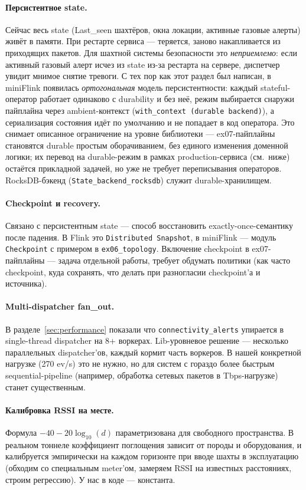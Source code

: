 \paragraph{Персистентное state.} Сейчас весь state (Last\_seen
шахтёров, окна локации, активные газовые алерты) живёт в памяти. При
рестарте сервиса --- теряется, заново накапливается из приходящих
пакетов. Для шахтной системы безопасности это \emph{неприемлемо}:
если активный газовый алерт исчез из state из-за рестарта на
сервере, диспетчер увидит мнимое снятие тревоги.
С тех пор как этот раздел был написан, в miniFlink появилась
\emph{ортогональная} модель персистентности: каждый stateful-оператор
работает одинаково с durability и без неё, режим выбирается снаружи
пайплайна через ambient-контекст (\texttt{with\_context (durable
backend)}), а сериализация состояния идёт по умолчанию и не попадает в
код оператора. Это снимает описанное ограничение на уровне
библиотеки --- ex07-пайплайны становятся durable простым оборачиванием,
без единого изменения доменной логики; их перевод на durable-режим в
рамках production-сервиса (см.\ ниже) остаётся прикладной задачей, но
уже не требует переписывания операторов. RocksDB-бэкенд
(\texttt{State\_backend\_rocksdb}) служит durable-хранилищем.

\paragraph{Checkpoint и recovery.} Связано с персистентным state ---
способ восстановить exactly-once-семантику после падения. В Flink
это \texttt{Distributed Snapshot}, в miniFlink --- модуль
\texttt{Checkpoint} с примером в \texttt{ex06\_topology}. Включение
checkpoint в ex07-пайплайны --- задача отдельной работы, требует
обдумать политики (как часто checkpoint, куда сохранять, что делать
при разногласии checkpoint'а и источника).

\paragraph{Multi-dispatcher fan\_out.} В разделе~\ref{sec:performance}
показали что \texttt{connectivity\_alerts} упирается в single-thread
dispatcher на 8+ воркерах. Lib-уровневое решение --- несколько
параллельных dispatcher'ов, каждый кормит часть воркеров. В нашей
конкретной нагрузке (270 ev/s) это не нужно, но для систем с
гораздо более быстрым sequential-pipeline (например, обработка
сетевых пакетов в Tbps-нагрузке) станет существенным.

\paragraph{Калибровка RSSI на месте.} Формула $-40 - 20\log_{10}(d)$
параметризована для свободного пространства. В реальном тоннеле
коэффициент поглощения зависит от породы и оборудования, и
калибруется эмпирически на каждом горизонте при вводе шахты в
эксплуатацию (обходим со специальным meter'ом, замеряем RSSI на
известных расстояниях, строим регрессию). У нас в коде ---
константа.

